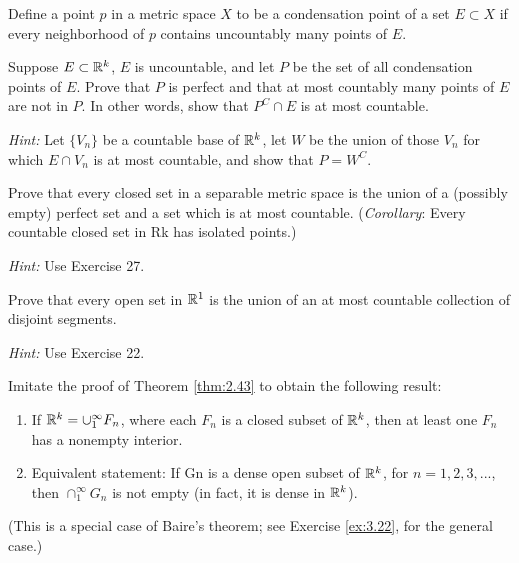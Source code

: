 \begin{myexercise}
    \label{ex:2.27}
    Define a point $p$ in a metric space $X$ to be a condensation point of a set $E \subset X$ if every neighborhood of $p$ contains uncountably many points of $E$. 
    
    Suppose $E \subset {\protect\mathbb R}^k$, $E$ is uncountable, 
    and let $P$ be the set of all condensation points of $E$.
    Prove that $P$ is perfect and that 
    at most countably many points of $E$ are not in $P$. 
    In other words, show that $P^C \cap E$ is at most countable. 
    
    \emph{Hint:} Let $\{V_n\}$ be a countable base of ${\protect\mathbb R}^k$, 
    let $W$ be the union of those $V_n$ for which $E \cap V_n$
    is at most countable, and show that $P = W^C$.
\end{myexercise}

\begin{myexercise}
    \label{ex:2.28}
    Prove that every closed set in a separable metric space is the union of a (possibly empty) perfect set and a set which is at most countable. 
    (\emph{Corollary}: Every countable closed set in Rk has isolated points.) 
    
    \emph{Hint:} Use Exercise 27.
\end{myexercise}


\begin{myexercise}
    \label{ex:2.29}
    Prove that every open set in ${\protect\mathbb R}^1$ is the union of an at most countable collection of disjoint segments. 

    \emph{Hint:} Use Exercise 22.
\end{myexercise}

\begin{myexercise}
    \label{ex:2.30}
    Imitate the proof of Theorem \ref{thm:2.43} to obtain the following result:
    \begin{enumerate}
        \item If ${\protect\mathbb R}^k = \cup_1^{\infty} F_n$, where each $F_n$ is a closed subset of ${\protect\mathbb R}^k$, then at least one $F_n$ has a nonempty interior. 
        \item Equivalent statement: If Gn is a dense open subset of ${\protect\mathbb R}^k$, for $n = 1, 2, 3, ... $, then $\cap_1^{\infty} G_n$ is not empty (in fact, it is dense in ${\protect\mathbb R}^k$).
    \end{enumerate}
    (This is a special case of Baire's theorem; see Exercise \ref{ex:3.22}, for the general case.)
\end{myexercise}